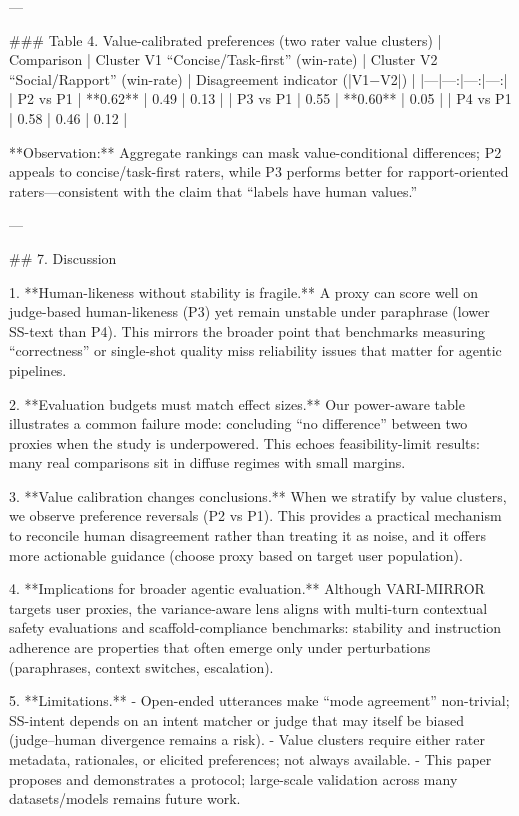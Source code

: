---

### Table 4. Value-calibrated preferences (two rater value clusters)  
| Comparison | Cluster V1 “Concise/Task-first” (win-rate) | Cluster V2 “Social/Rapport” (win-rate) | Disagreement indicator (|V1−V2|) |
|---|---:|---:|---:|
| P2 vs P1 | **0.62** | 0.49 | 0.13 |
| P3 vs P1 | 0.55 | **0.60** | 0.05 |
| P4 vs P1 | 0.58 | 0.46 | 0.12 |

**Observation:** Aggregate rankings can mask value-conditional differences; P2 appeals to concise/task-first raters, while P3 performs better for rapport-oriented raters—consistent with the claim that “labels have human values.”

---

## 7. Discussion  

1. **Human-likeness without stability is fragile.** A proxy can score well on judge-based human-likeness (P3) yet remain unstable under paraphrase (lower SS-text than P4). This mirrors the broader point that benchmarks measuring “correctness” or single-shot quality miss reliability issues that matter for agentic pipelines.

2. **Evaluation budgets must match effect sizes.** Our power-aware table illustrates a common failure mode: concluding “no difference” between two proxies when the study is underpowered. This echoes feasibility-limit results: many real comparisons sit in diffuse regimes with small margins.

3. **Value calibration changes conclusions.** When we stratify by value clusters, we observe preference reversals (P2 vs P1). This provides a practical mechanism to reconcile human disagreement rather than treating it as noise, and it offers more actionable guidance (choose proxy based on target user population).

4. **Implications for broader agentic evaluation.** Although VARI-MIRROR targets user proxies, the variance-aware lens aligns with multi-turn contextual safety evaluations and scaffold-compliance benchmarks: stability and instruction adherence are properties that often emerge only under perturbations (paraphrases, context switches, escalation).

5. **Limitations.**  
   - Open-ended utterances make “mode agreement” non-trivial; SS-intent depends on an intent matcher or judge that may itself be biased (judge–human divergence remains a risk).  
   - Value clusters require either rater metadata, rationales, or elicited preferences; not always available.  
   - This paper proposes and demonstrates a protocol; large-scale validation across many datasets/models remains future work.

